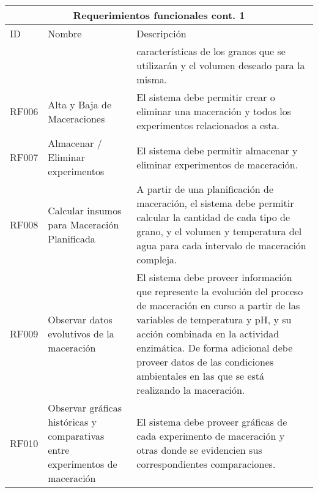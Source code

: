    \begin{table}[H]
    \begin{center}
    \begin{tabularx}{\textwidth}{| X | X | X |}
    \hline
    \multicolumn{3}{|c|}{\textbf{Requerimientos funcionales cont. 1}} \\
    \hline
    ID & Nombre & Descripción \\
    \hline
    \hline
         &   & características de los granos que se utilizarán y el volumen deseado para la misma.
        \\\hline
        RF006 & Alta y Baja de Maceraciones & El sistema debe permitir crear o eliminar una maceración y todos los experimentos relacionados a esta.  \\\hline
        RF007 & Almacenar / Eliminar experimentos  & El sistema debe permitir almacenar y eliminar experimentos de maceración.
        \\\hline
        RF008 & Calcular insumos para Maceración Planificada & A partir de una planificación de maceración, el sistema debe permitir calcular la cantidad de cada tipo de grano, y el volumen y temperatura del agua para cada intervalo de maceración compleja.
        \\\hline
        RF009 & Observar datos evolutivos de la maceración & El sistema debe proveer información que represente la evolución del proceso de maceración en curso a partir de las variables de temperatura y pH, y su acción combinada en la actividad enzimática. De forma adicional debe proveer datos de las condiciones ambientales en las que se está realizando la maceración.
        \\\hline
        RF010 & Observar gráficas históricas y comparativas entre experimentos de maceración & El sistema debe proveer gráficas de cada experimento de maceración y otras donde se evidencien sus correspondientes comparaciones. \\\hline
    \end{tabularx}
    \label{ReqFuncionales_Parte2}
    \end{center}
    \end{table}
    
